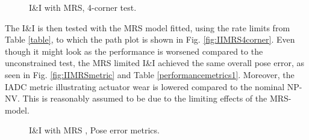 \begin{figure}[!h]
    \centering
    \caption{I\&I with MRS, 4-corner test. }
\end{figure}\label{fig:IIMRS4corner}

The I\&I is then tested with the MRS model fitted, using the rate limits from Table \ref{table}, to which the path plot is shown in Fig. \ref{fig:IIMRS4corner}. Even though it might look as the performance is worsened compared to the unconstrained test, the MRS limited I\&I achieved the same overall pose error, as seen in Fig. \ref{fig:IIMRSmetric} and Table \ref{performancemetrics1}. Moreover, the IADC metric illustrating actuator wear is lowered compared to the nominal NP-NV. This is reasonably assumed to be due to the limiting effects of the MRS-model. 

\begin{figure}[!h]
    \centering
    \caption{I\&I with MRS , Pose error metrics.}
\end{figure}\label{fig:IIMRSmetric}

